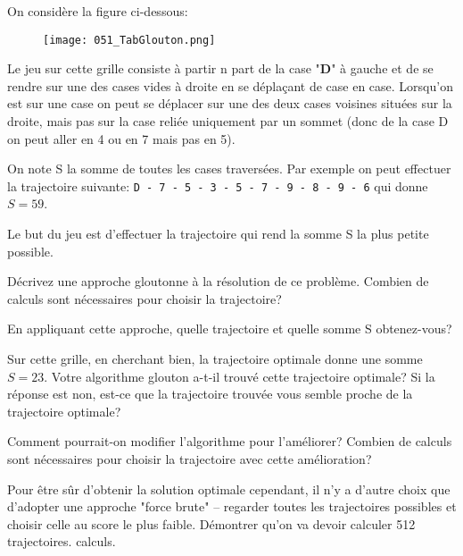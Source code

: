 \documentclass[12pt]{article}
\begin{document}
	\begin{MonExo}
		On considère la figure ci-dessous:
		\begin{figure}[H]
			\centering
			\texttt{[image: 051\_TabGlouton.png]}
		\end{figure}
		Le jeu sur cette grille consiste à partir n part de la case "\textbf{D}" à gauche et de se rendre sur une des cases vides à droite en se déplaçant de case en case. Lorsqu'on est sur une case on peut se déplacer sur une des deux cases voisines situées sur la droite, mais pas sur la case reliée uniquement par un sommet (donc de la case D on peut aller en 4 ou en 7 mais pas en 5).
		
		On note S la somme de toutes les cases traversées. Par exemple on peut effectuer la trajectoire suivante: \texttt{D - 7 - 5 - 3 - 5 - 7 - 9 - 8 - 9 - 6} qui donne $S = 59$.
		
		Le but du jeu est d'effectuer la trajectoire qui rend la somme S la plus petite possible.
		
		\begin{alphenum}
			\item Décrivez une approche gloutonne à la résolution de ce problème. Combien de calculs sont nécessaires pour choisir la trajectoire?
			\item En appliquant cette approche, quelle trajectoire et quelle somme S obtenez-vous?
			\item Sur cette grille, en cherchant bien, la trajectoire optimale donne une somme $S = 23$. Votre algorithme glouton a-t-il trouvé cette trajectoire optimale? Si la réponse est non, est-ce que la trajectoire trouvée vous semble proche de la trajectoire optimale?
			\item Comment pourrait-on modifier l'algorithme pour l'améliorer? Combien de calculs sont nécessaires pour choisir la trajectoire avec cette amélioration?
			\item Pour être sûr d'obtenir la solution optimale cependant, il n'y a d'autre choix que d'adopter une approche "force brute" -- regarder toutes les trajectoires possibles et choisir celle au score le plus faible. Démontrer qu'on va devoir calculer 512 trajectoires.
calculs.
		\end{alphenum}
	\end{MonExo}
\end{document}
